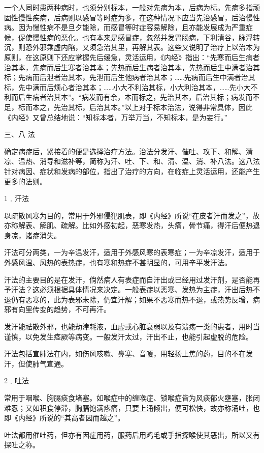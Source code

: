 \documentclass[12pt,UTF8]{ctexbook}
\begin{document}
一个人同时患两种病时，也须分别标本，一般对先病为本，后病为标。先病多指顽固性慢性疾病，后病则以感冒等时症为多，在这种情况下应当先治感冒，后治慢性病。因为慢性病不是旦夕能除，而感冒等时症容易解除，且亦能发展成为严重症候，促使慢性病的恶化。也有本来是感冒症，忽然并发胃肠病，下利清谷，脉浮转沉，则恐外邪乘虚内陷，又须急治其里，再解其表。这些又说明了治疗上以治本为原则，在这原则下还应掌握先后缓急，灵活运用，《内经》指出：“先寒而后生病者治其本，先病而后生寒者治其本；先热而后生病者治其本，先热而后生中满者治其标；先病而后泄者治其本，先泄而后生他病者治其本；……先病而后生中满者治其标，先中满而后烦心者治其本；……小大不利治其标，小大利治其本，……先小大不利而后生病者治其本”。“病发而有余，本而标之，先治其本，后治其标；病发而不足，标而本之，先治其标，后治其本。”以上对于标本治法，说得非常具体，因此《内经》又曾总结地说：“知标本者，万举万当，不知标本，是为妄行。”

三、八 法

确定病症后，紧接着的便是选择治疗方法。治法分发汗、催吐、攻下、和解、清凉、温热、消导和滋补等，简称为汗、吐、下、和、清、温、消、补八法。这八法针对病因、症状和发病的部位，指出了治疗的方向，在临症上灵活运用，还能产生更多的法则。

1﹒汗法

以疏散风寒为目的，常用于外邪侵犯肌表，即《内经》所说“在皮者汗而发之”，故亦称解表、解肌、疏解。比如外感初起，恶寒发热，头痛，骨节痛，得汗后便热退身凉，诸症消失。

汗法可分两类，一为辛温发汗，适用于外感风寒的表寒症；一为辛凉发汗，适用于外感风温、风热的表热症，也有寒和热症不甚明显的，可用辛平发汗法。

汗法的主要目的是在发汗，倘然病人有表症而自汗出或已经用过发汗剂，是否能再予汗法？这必须根据具体情况来决定。一般表症以恶寒、发热为主症，汗出后热不退仍有恶寒的，此为表邪未除，仍宜汗解；如果不恶寒而热不退，或热势反增，病邪有向里传变的趋势，不可再汗。

发汗能祛散外邪，也能劫津耗液，血虚或心脏衰弱以及有溃疡一类的患者，用时当谨慎，以免发生痉厥等病变。一般发汗太过，汗出不止，也能引起虚脱的危险。

汗法包括宣肺法在内，如伤风咳嗽、鼻塞、音嗄，用轻扬上焦的药，目的不在发汗，但使肺气宣通。

2﹒吐法

常用于咽喉、胸膈痰食堵塞。如喉症中的缠喉症、锁喉症皆为风痰郁火壅塞，胀闭难忍；又如积食停滞，胸膈饱满疼痛，只要上涌倾出，便可松快，故亦称涌吐，也即《内经》所说的“其高者因而越之”。

吐法都用催吐药，但亦有因症用药，服药后用鸡毛或手指探喉使其恶出，所以又有探吐之称。
\end{document}
